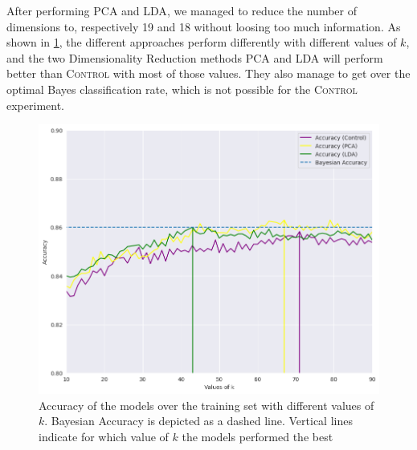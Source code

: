 	After performing \textsc{PCA} and \textsc{LDA}, we managed to reduce the number of dimensions to, respectively 19 and 18 without loosing too much information. As shown in \cref{k-tuning}, the different approaches perform differently with different values of $k$, and the two Dimensionality Reduction methods \textsc{PCA} and \textsc{LDA} will perform better than \textsc{Control} with most of those values. They also manage to get over the optimal Bayes classification rate, which is not possible for the \textsc{Control} experiment.
	\begin{figure}[ht]
		\vskip 0.2in
		\begin{center}
			\centerline{\includegraphics[width=\columnwidth]{img/k_tuning-pca-lda.png}}
			\caption{Accuracy of the models over the training set with different values of $k$. Bayesian Accuracy is depicted as a dashed line. Vertical lines indicate for which value of $k$ the models performed the best}
			\label{k-tuning}
		\end{center}
		\vskip -0.2in
	\end{figure}

